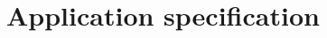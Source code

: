\section{Application specification}
\label{sec:app:specification}
% 
% 
% 
% 
% 
% 
% 
% 
% 
% 




